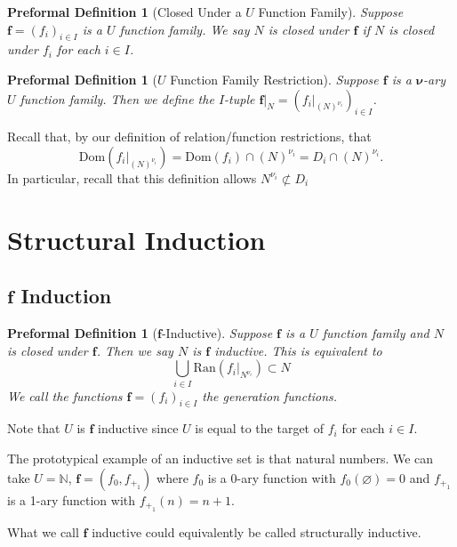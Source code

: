 \documentclass[oneside, 12pt]{book}
\theoremstyle{break}
\newtheorem{preformal definition}[definition]{Preformal Definition}
\newtheorem{preformal theorem}[theorem]{Preformal Theorem}
\newcommand{\bv}[1]{\boldsymbol{#1}}
\newcommand{\N}[0]{\mathbb{N}}
\begin{document}
			\begin{preformal definition}[Closed Under a $U$ Function Family]
				Suppose $\bv{f} = (f_i)_{i\in I}$ is a $U$ function family.
				We say $N$ is closed under $\bv{f}$ if $N$ is closed under $f_i$ for each $i\in I$.
			\end{preformal definition}
			
			\begin{preformal definition}[$U$ Function Family Restriction]
				Suppose $\bv{f}$ is a $\bv{\nu}$-ary $U$ function family.
				Then we define the $I$-tuple $\bv{f}|_{N} = (f_i|_{(N)^{\nu_i}})_{i\in I}$.
			\end{preformal definition}
			Recall that, by our definition of relation/function restrictions, that 
			\begin{equation*}
				\text{Dom}(f_i|_{(N)^{\nu_i}}) = \text{Dom}(f_i) \cap (N)^{\nu_i} = D_i \cap (N)^{\nu_i}.
			\end{equation*}
			In particular, recall that this definition allows $N^{\nu_i} \not \subset D_i$
		\section{Structural Induction}
			\subsection{$\bv{f}$ Induction}
				
				\begin{preformal definition}[$\bv{f}$-Inductive]
					Suppose $\bv{f}$ is a $U$ function family and $N$ is closed under $\bv{f}$.
					Then we say $N$ is $\bv{f}$ inductive.
					This is equivalent to
					\begin{equation*}
						\bigcup_{i\in I} \text{Ran}(f_i|_{N^{\nu_i}}) \subset N
					\end{equation*}
					We call the functions $\bv{f}=(f_i)_{i\in I}$ the generation functions.
				\end{preformal definition}
				Note that $U$ is $\bv{f}$ inductive since $U$ is equal to the target of $f_i$ for each $i\in I$.
				
				The prototypical example of an inductive set is that natural numbers.
				We can take $U = \N$, $\bv{f} = (f_0, f_{+_1})$ where $f_0$ is a 0-ary function with $f_0(\varnothing) = 0$ and $f_{+_1}$ is a 1-ary function with $f_{+_1}(n) = n + 1$.
				
				What we call $\bv{f}$ inductive could equivalently be called structurally inductive.
				
\end{document}
